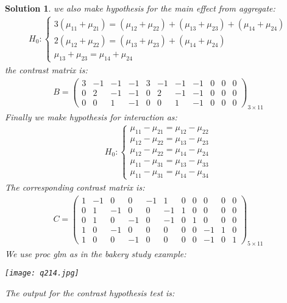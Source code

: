\documentclass[11pt]{article}
\newtheorem{sol}{Solution}
\begin{document}
\begin{sol}
	we also make hypothesis for the main effect from aggregate:
	\begin{align*}
		H_0: \left\{\begin{array}{l} 3(\mu_{11} + \mu_{21}) = (\mu_{12} + \mu_{22}) + (\mu_{13} + \mu_{23}) + (\mu_{14} + \mu_{24}) \\ 2(\mu_{12} + \mu_{22}) = (\mu_{13} + \mu_{23}) + (\mu_{14} + \mu_{24})\\ \mu_{13} + \mu_{23}=  \mu_{14} + \mu_{24}\end{array}\right.
	\end{align*}
	the contrast matrix is:
	\begin{align*}
		B = \left(\begin{array}{ccccccccccc} 3&-1&-1&-1&3&-1&-1&-1&0&0&0\\ 0&2&-1&-1&0&2&-1&-1&0&0&0\\ 0&0&1&-1&0&0&1&-1&0&0&0\end{array}\right)_{3 \times 11}
	\end{align*}
	Finally we make hypothesis for interaction as:
	\begin{align*}
		H_0: \left\{\begin{array}{l} \mu_{11} - \mu_{21} = \mu_{12} - \mu_{22}\\ \mu_{12} - \mu_{22} = \mu_{13} - \mu_{23}\\ \mu_{12} - \mu_{22} = \mu_{14} - \mu_{24}\\ \mu_{11} - \mu_{31} = \mu_{13} - \mu_{33}\\ \mu_{11} - \mu_{31} = \mu_{14} - \mu_{34}\end{array}\right.
	\end{align*}
	The corresponding contrast matrix is:
	\begin{align*}
		C = \left(\begin{array}{ccccccccccc}1&-1&0&0&-1&1&0&0&0&0&0\\ 0&1&-1&0&0&-1&1&0&0&0&0\\ 0&1&0&-1&0&-1&0&1&0&0&0\\ 1&0&-1&0&0&0&0&0&-1&1&0\\ 1&0&0&-1&0&0&0&0&-1&0&1\end{array}\right)_{5 \times 11}
	\end{align*}
	We use proc glm as in the bakery study example:
	\begin{center}
		\texttt{[image: q214.jpg]}
	\end{center}
	The output for the contrast hypothesis test is:
	\begin{center}

\end{center}
\end{sol}
\end{document}
